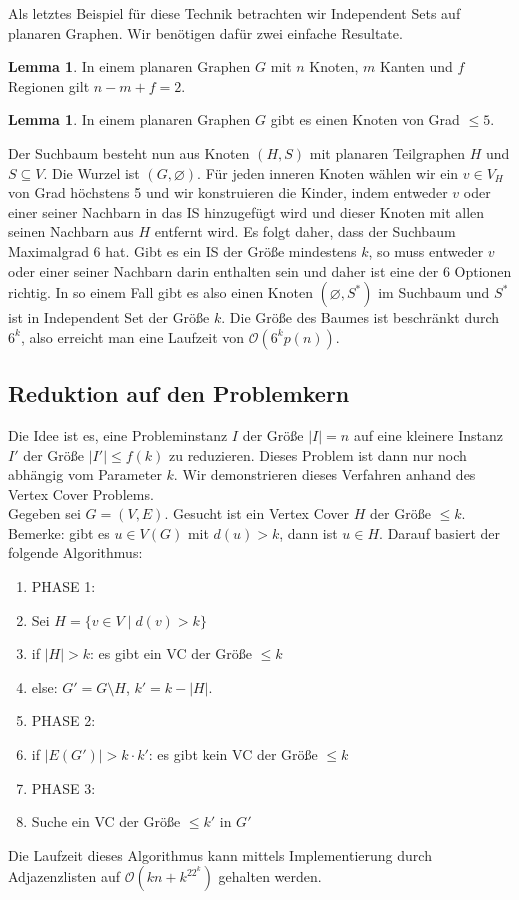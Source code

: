 \documentclass[a4paper, 12pt]{article}
\theoremstyle{plain}
\theoremstyle{definition}
\theoremstyle{lemma}
\newtheorem{lemma}[theorem]{Lemma}
\theoremstyle{remark}
\theoremstyle{corollary}
\theoremstyle{example}
\begin{document}
	Als letztes Beispiel für diese Technik betrachten wir Independent Sets auf planaren Graphen. Wir benötigen dafür zwei einfache Resultate.
	\begin{lemma}
		In einem planaren Graphen $G$ mit $n$ Knoten, $m$ Kanten und $f$ Regionen gilt $n-m+f = 2$.
	\end{lemma}
	\begin{lemma}
		In einem planaren Graphen $G$ gibt es einen Knoten von Grad $\leq 5$.
	\end{lemma}
	Der Suchbaum besteht nun aus Knoten $(H,S)$ mit planaren Teilgraphen $H$ und $S \subseteq V$. Die Wurzel ist $(G,\varnothing)$. Für jeden inneren Knoten wählen wir ein $v \in V_H$ von Grad höchstens 5 und wir konstruieren die Kinder, indem entweder $v$ oder einer seiner Nachbarn in das IS hinzugefügt wird und dieser Knoten mit allen seinen Nachbarn aus $H$ entfernt wird. Es folgt daher, dass der Suchbaum Maximalgrad 6 hat. Gibt es ein IS der Größe mindestens $k$, so muss entweder $v$ oder einer seiner Nachbarn darin enthalten sein und daher ist eine der 6 Optionen richtig. In so einem Fall gibt es also einen Knoten $(\varnothing, S^*)$ im Suchbaum und $S^*$ ist in Independent Set der Größe $k$. Die Größe des Baumes ist beschränkt durch $6^k$, also erreicht man eine Laufzeit von $\mathcal{O}(6^k p(n))$.
	\subsection{Reduktion auf den Problemkern}
	Die Idee ist es, eine Probleminstanz $I$ der Größe $\left|I\right| = n$ auf eine kleinere Instanz $I'$ der Größe $\left|I'\right| \leq f(k)$ zu reduzieren. Dieses Problem ist dann nur noch abhängig vom Parameter $k$. Wir demonstrieren dieses Verfahren anhand des Vertex Cover Problems.\\
	Gegeben sei $G = (V,E)$. Gesucht ist ein Vertex Cover $H$ der Größe $\leq k$. Bemerke: gibt es $u \in V(G)$ mit $d(u) > k$, dann ist $u \in H$. Darauf basiert der folgende Algorithmus:
	\begin{enumerate}
		\item PHASE 1:
		\item Sei $H = \{v \in V \mid d(v) > k\}$
		\item if $\left|H\right| > k$: es gibt ein VC der Größe $\leq k$
		\item else: $G' = G \setminus H$, $k' = k - \left|H\right|$.
		\item PHASE 2:
		\item if $\left|E(G')\right| > k\cdot k'$: es gibt kein VC der Größe $\leq k$
		\item PHASE 3:
		\item Suche ein VC der Größe $\leq k'$ in $G'$
	\end{enumerate}
	Die Laufzeit dieses Algorithmus kann mittels Implementierung durch Adjazenzlisten auf $\mathcal{O}(kn + k^22^k)$ gehalten werden.
	
\end{document}
